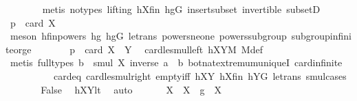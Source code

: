 \begin{isabellebody}
\ \ \ \ \ \ \isamarkupfalse%
\ {\isacharparenleft}{\kern0pt}metis\ {\isacharparenleft}{\kern0pt}no{\isacharunderscore}{\kern0pt}types{\isacharcomma}{\kern0pt}\ lifting{\isacharparenright}{\kern0pt}\ hXfin\ hgG\ insert{\isacharunderscore}{\kern0pt}subset\ invertible\ subsetD{\isacharparenright}{\kern0pt}\isanewline
\ \ \ \ \isamarkupfalse%
\ \isamarkupfalse%
\ {\isachardoublequoteopen}p\ {\isasymle}\ card\ X{\isachardoublequoteclose}\ \isanewline
\ \ \ \ \ \ \isamarkupfalse%
\ {\isacharparenleft}{\kern0pt}meson\ hfinpowers\ hg{}\ hgG\ le{\isacharunderscore}{\kern0pt}trans\ powers{\isacharunderscore}{\kern0pt}ne{\isacharunderscore}{\kern0pt}one\ powers{\isacharunderscore}{\kern0pt}subgroup\ subgroup{\isacharunderscore}{\kern0pt}infinite{\isacharunderscore}{\kern0pt}or{\isacharunderscore}{\kern0pt}ge{\isacharparenright}{\kern0pt}\isanewline
\ \ \ \ \isamarkupfalse%
\ \isamarkupfalse%
\ {\isachardoublequoteopen}p\ {\isasymle}\ card\ {\isacharparenleft}{\kern0pt}X\ {\isasymcdots}\ Y{\isacharparenright}{\kern0pt}{\isachardoublequoteclose}\ \isamarkupfalse%
\ card{\isacharunderscore}{\kern0pt}le{\isacharunderscore}{\kern0pt}smul{\isacharunderscore}{\kern0pt}left\ hXYM\ M{\isacharunderscore}{\kern0pt}def\ \isanewline
\ \ \ \ \ \ \isamarkupfalse%
\ {\isacharparenleft}{\kern0pt}metis\ {\isacharparenleft}{\kern0pt}full{\isacharunderscore}{\kern0pt}types{\isacharparenright}{\kern0pt}\ {\isacartoucheopen}b\ {\isasymin}\ smul\ X\ {\isacharbraceleft}{\kern0pt}inverse\ a\ {\isasymcdot}\ b{\isacharbraceright}{\kern0pt}{\isacartoucheclose}\ bot{\isacharunderscore}{\kern0pt}nat{\isacharunderscore}{\kern0pt}{}{\isachardot}{\kern0pt}extremum{\isacharunderscore}{\kern0pt}uniqueI\ card{\isachardot}{\kern0pt}infinite\ \isanewline
\ \ \ \ \ \ \ \ \ \ card{\isacharunderscore}{\kern0pt}{}{\isacharunderscore}{\kern0pt}eq\ card{\isacharunderscore}{\kern0pt}le{\isacharunderscore}{\kern0pt}smul{\isacharunderscore}{\kern0pt}right\ empty{\isacharunderscore}{\kern0pt}iff\ hXY\ hXfin\ hYG\ le{\isacharunderscore}{\kern0pt}trans\ smul{\isachardot}{\kern0pt}cases{\isacharparenright}{\kern0pt}\isanewline
\ \ \ \ \isamarkupfalse%
\ \isamarkupfalse%
\ False\ \isamarkupfalse%
\ hXYlt\ \isamarkupfalse%
\ auto\isanewline
\ \ \isamarkupfalse%
\isanewline
\ \ \isamarkupfalse%
\ {\isacharquery}{\kern0pt}X{}\ {\isacharequal}{\kern0pt}\ {\isachardoublequoteopen}{\isacharparenleft}{\kern0pt}X\ {\isasymcdots}\ {\isacharbraceleft}{\kern0pt}g{\isacharbraceright}{\kern0pt}{\isacharparenright}{\kern0pt}\ {\isasyminter}\ X{\isachardoublequoteclose}\isanewline

\end{isabellebody}
